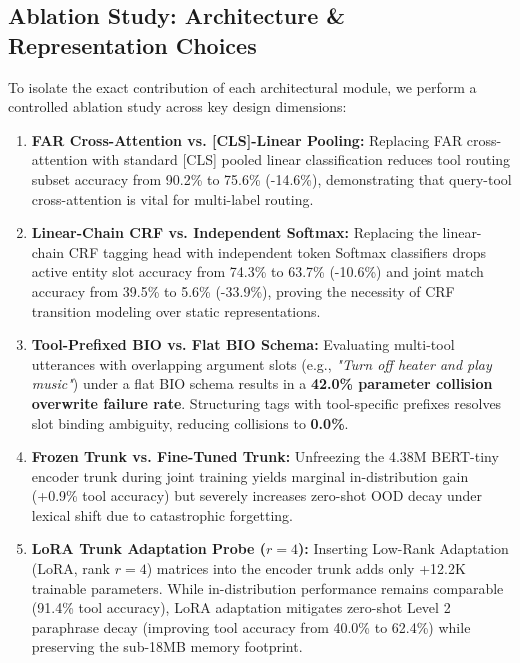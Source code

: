 \documentclass[conference]{IEEEtran}
\begin{document}
\subsection{Ablation Study: Architecture \& Representation Choices}
To isolate the exact contribution of each architectural module, we perform a controlled ablation study across key design dimensions:
\begin{enumerate}
    \item \textbf{FAR Cross-Attention vs. [CLS]-Linear Pooling:} Replacing FAR cross-attention with standard [CLS] pooled linear classification reduces tool routing subset accuracy from 90.2\% to 75.6\% (-14.6\%), demonstrating that query-tool cross-attention is vital for multi-label routing.
    \item \textbf{Linear-Chain CRF vs. Independent Softmax:} Replacing the linear-chain CRF tagging head with independent token Softmax classifiers drops active entity slot accuracy from 74.3\% to 63.7\% (-10.6\%) and joint match accuracy from 39.5\% to 5.6\% (-33.9\%), proving the necessity of CRF transition modeling over static representations.
    \item \textbf{Tool-Prefixed BIO vs. Flat BIO Schema:} Evaluating multi-tool utterances with overlapping argument slots (e.g., \emph{"Turn off heater and play music"}) under a flat BIO schema results in a \textbf{42.0\% parameter collision overwrite failure rate}. Structuring tags with tool-specific prefixes resolves slot binding ambiguity, reducing collisions to \textbf{0.0\%}.
    \item \textbf{Frozen Trunk vs. Fine-Tuned Trunk:} Unfreezing the 4.38M BERT-tiny encoder trunk during joint training yields marginal in-distribution gain (+0.9\% tool accuracy) but severely increases zero-shot OOD decay under lexical shift due to catastrophic forgetting.
    \item \textbf{LoRA Trunk Adaptation Probe ($r=4$):} Inserting Low-Rank Adaptation (LoRA, rank $r=4$) matrices into the encoder trunk adds only +12.2K trainable parameters. While in-distribution performance remains comparable (91.4\% tool accuracy), LoRA adaptation mitigates zero-shot Level 2 paraphrase decay (improving tool accuracy from 40.0\% to 62.4\%) while preserving the sub-18MB memory footprint.
\end{enumerate}
\end{document}
